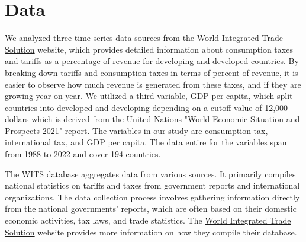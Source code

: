 \documentclass[12pt]{article}
\begin{document}
\section{Data}
\label{sec:data}

We analyzed three time series data sources from the \href{https://wits.worldbank.org/CountryProfile/en/Country/BY-COUNTRY/StartYear/1988/EndYear/2022/Indicator/GC-TAX-GSRV-VA-ZS}{World Integrated Trade Solution} website, which provides detailed information about consumption taxes and tariffs as a percentage of revenue for developing and developed countries. By breaking down tariffs and consumption taxes in terms of percent of revenue, it is easier to observe how much revenue is generated from these taxes, and if they are growing year on year. We utilized a third variable, GDP per capita, which split countries into developed and developing depending on a cutoff value of 12,000 dollars which is derived from the United Nations "World Economic Situation and Prospects 2021" report. The variables in our study are consumption tax, international tax, and GDP per capita. The data entire for the variables span from 1988 to 2022 and cover 194 countries. 

The WITS database aggregates data from various sources. It primarily compiles national statistics on tariffs and taxes from government reports and international organizations. The data collection process involves gathering information directly from the national governments' reports, which are often based on their domestic economic activities, tax laws, and trade statistics. The \href{https://wits.worldbank.org/CountryProfile/en/Country/BY-COUNTRY/StartYear/1988/EndYear/2022/Indicator/GC-TAX-GSRV-VA-ZS}{World Integrated Trade Solution} website provides more information on how they compile their database.
\end{document}

